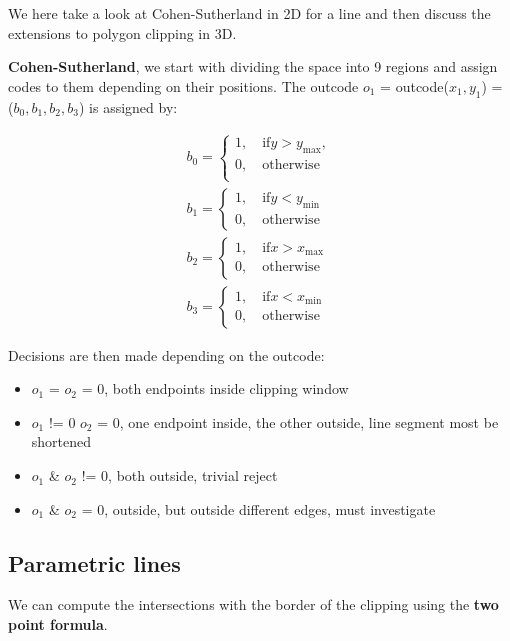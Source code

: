 	We here take a look at Cohen-Sutherland in 2D for a line and then discuss the extensions to polygon clipping in 3D. 

	\textbf{Cohen-Sutherland}, we start with dividing the space into 9 regions and assign codes to them depending on their positions. The outcode $o_1$ = outcode($x_1,y_1$) = ($b_0,b_1,b_2,b_3$) is assigned by:

		\begin{equation}
		\begin{aligned}
		b_0 = \begin{cases}
		1, \quad \text{if} y > y_{\text{max}},  \\
		0, \quad \text{otherwise} \\
		\end{cases} \\
		b_1 = \begin{cases}
		1, \quad \text{if} y < y_{\text{min}} \\
		0, \quad \text{otherwise}
		\end{cases} \\
		b_2 = \begin{cases}
		1, \quad \text{if} x > x_{\text{max}} \\
		0, \quad \text{otherwise} 
		\end{cases} \\
		b_3 = \begin{cases}
		1, \quad \text{if} x < x_{\text{min}} \\
		0, \quad \text{otherwise}
		\end{cases} 
		\end{aligned}
		\end{equation}

	Decisions are then made depending on the outcode:

	\begin{itemize}
		\item $o_1$ = $o_2$ = 0, both endpoints inside clipping window
		\item $o_1$ != 0 $o_2$ = 0, one endpoint inside, the other outside, line segment most be shortened
		\item $o_1$ \& $o_2$ != 0, both outside, trivial reject
		\item $o_1$ \& $o_2$ = 0, outside, but outside different edges, must investigate
	\end{itemize}

	\subsection*{Parametric lines}
	We can compute the intersections with the border of the clipping using the \textbf{two point formula}. 

